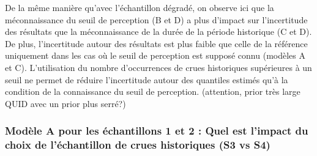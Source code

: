 \documentclass[11pt]{article}
\begin{document}
	 De la même manière qu'avec l'échantillon dégradé, on observe ici que la méconnaissance du seuil de perception (B et D) a plus d'impact sur l'incertitude des résultats que la méconnaissance de la durée de la période historique (C et D). De plus, l'incertitude autour des résultats est plus faible que celle de la référence uniquement dans les cas où le seuil de perception est supposé connu (modèles A et C). L'utilisation du nombre d'occurrences de crues historiques supérieures à un seuil ne permet de réduire l'incertitude autour des quantiles estimés qu'à la condition de la connaissance du seuil de perception. (attention, prior très large QUID avec un prior plus serré?)


	
		\subsubsection{Modèle A pour les échantillons 1 et 2 : Quel est l'impact du choix de l'échantillon de crues historiques (S3 vs S4)}
	
	
	
	
	\FloatBarrier
	
\end{document}
